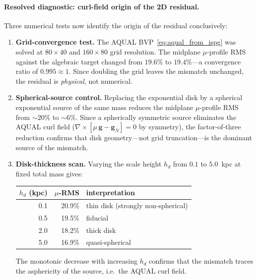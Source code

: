\documentclass[11pt]{article}
\begin{document}
\paragraph{Resolved diagnostic: curl-field origin of the 2D residual.}
Three numerical tests now identify the origin of the residual
conclusively:
\begin{enumerate}
  \item \textbf{Grid-convergence test.}
    The AQUAL BVP~\eqref{eq:aqual_from_ispg} was solved at
    $80\times40$ and $160\times80$ grid resolution.  The midplane
    $\mu$-profile RMS against the algebraic target changed from
    $19.6\%$ to $19.4\%$---a convergence ratio of $0.995\approx1$.
    Since doubling the grid leaves the mismatch unchanged, the
    residual is \emph{physical}, not numerical.
  \item \textbf{Spherical-source control.}
    Replacing the exponential disk by a spherical exponential source
    of the same mass reduces the midplane $\mu$-profile RMS from
    $\sim\!20\%$ to $\sim\!6\%$.  Since a spherically symmetric
    source eliminates the AQUAL curl field
    ($\nabla\times[\mu\,\mathbf{g}-\mathbf{g}_N]=0$ by symmetry),
    the factor-of-three reduction confirms that disk geometry---not
    grid truncation---is the dominant source of the mismatch.
  \item \textbf{Disk-thickness scan.}
    Varying the scale height $h_d$ from $0.1$ to $5.0$~kpc
    at fixed total mass gives:
    \begin{center}
    \small
    \begin{tabular}{r@{\quad}r@{\quad}l}
    $h_d$ (kpc) & $\mu$-RMS & interpretation \\
    \hline
    0.1 & 20.9\% & thin disk (strongly non-spherical) \\
    0.5 & 19.5\% & fiducial \\
    2.0 & 18.2\% & thick disk \\
    5.0 & 16.9\% & quasi-spherical
    \end{tabular}
    \end{center}
    The monotonic decrease with increasing $h_d$ confirms that
    the mismatch traces the asphericity of the source, i.e.\
    the AQUAL curl field.
\end{enumerate}
\end{document}
